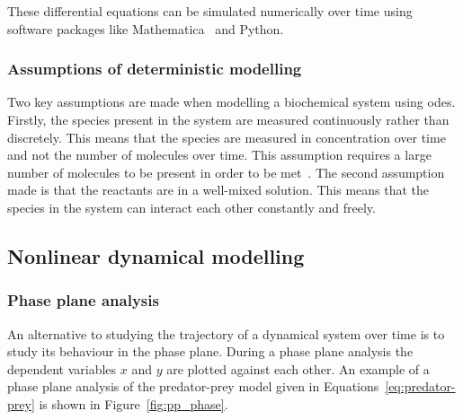 \noindent These differential equations can be simulated numerically over time using software packages like Mathematica~\autocite{mathematica:2016} and Python.

\subsubsection{Assumptions of deterministic modelling}

Two key assumptions are made when modelling a biochemical system using \acrshort{ode}s. Firstly, the species present in the system are measured continuously rather than discretely. This means that the species are measured in concentration over time and not the number of molecules over time. This assumption requires a large number of molecules to be present in order to be met~\autocite{iglesias:2010}. The second assumption made is that the reactants are in a well-mixed solution. This means that the species in the system can interact each other constantly and freely. 


\subsection{Nonlinear dynamical modelling}

\subsubsection{Phase plane analysis}
An alternative to studying the trajectory of a dynamical system over time is to study its behaviour in the phase plane. During a phase plane analysis the dependent variables $x$ and $y$ are plotted against each other. An example of a phase plane analysis of the predator-prey model given in Equations~\ref{eq:predator-prey} is shown in Figure~\ref{fig:pp_phase}.

